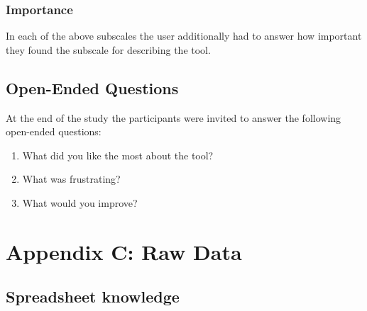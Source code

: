 \subsection*{Importance}
In each of the above subscales the user additionally had to answer how important they found the subscale for describing the tool.
\begin{table}[H]
    \centering
\end{table}


\begin{samepage}
    \section*{Open-Ended Questions}
    At the end of the study the participants were invited to answer the following open-ended questions:
    \begin{enumerate}
        \item What did you like the most about the tool?
        \item What was frustrating?
        \item What would you improve?
    \end{enumerate}
\end{samepage}

\chapter{Appendix C: Raw Data}
\section*{Spreadsheet knowledge}
\begin{table}[H]
    \centering
\end{table}

